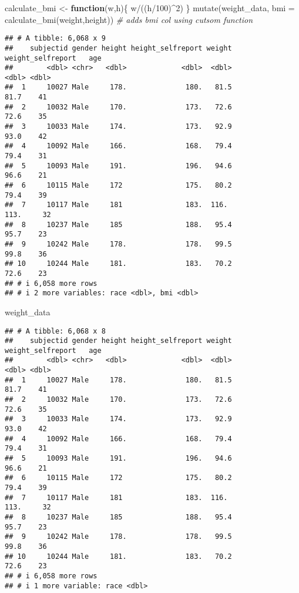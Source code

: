 \documentclass[
]{article}
\newenvironment{Shaded}{\begin{snugshade}}{\end{snugshade}}
\newcommand{\AttributeTok}[1]{\textcolor[rgb]{0.77,0.63,0.00}{#1}}
\newcommand{\CommentTok}[1]{\textcolor[rgb]{0.56,0.35,0.01}{\textit{#1}}}
\newcommand{\ControlFlowTok}[1]{\textcolor[rgb]{0.13,0.29,0.53}{\textbf{#1}}}
\newcommand{\DecValTok}[1]{\textcolor[rgb]{0.00,0.00,0.81}{#1}}
\newcommand{\FunctionTok}[1]{\textcolor[rgb]{0.00,0.00,0.00}{#1}}
\newcommand{\NormalTok}[1]{#1}
\newcommand{\OtherTok}[1]{\textcolor[rgb]{0.56,0.35,0.01}{#1}}
\newcommand{\SpecialCharTok}[1]{\textcolor[rgb]{0.00,0.00,0.00}{#1}}
\begin{document}
\begin{Shaded}
\begin{Highlighting}[]
\NormalTok{calculate\_bmi }\OtherTok{\textless{}{-}} \ControlFlowTok{function}\NormalTok{(w,h)\{ w}\SpecialCharTok{/}\NormalTok{((h}\SpecialCharTok{/}\DecValTok{100}\NormalTok{)}\SpecialCharTok{\^{}}\DecValTok{2}\NormalTok{) \}}
\FunctionTok{mutate}\NormalTok{(weight\_data, }\AttributeTok{bmi =} \FunctionTok{calculate\_bmi}\NormalTok{(weight,height)) }\CommentTok{\# adds bmi col using cutsom function}
\end{Highlighting}
\end{Shaded}

\begin{verbatim}
## # A tibble: 6,068 x 9
##    subjectid gender height height_selfreport weight weight_selfreport   age
##        <dbl> <chr>   <dbl>             <dbl>  <dbl>             <dbl> <dbl>
##  1     10027 Male     178.              180.   81.5              81.7    41
##  2     10032 Male     170.              173.   72.6              72.6    35
##  3     10033 Male     174.              173.   92.9              93.0    42
##  4     10092 Male     166.              168.   79.4              79.4    31
##  5     10093 Male     191.              196.   94.6              96.6    21
##  6     10115 Male     172               175.   80.2              79.4    39
##  7     10117 Male     181               183.  116.              113.     32
##  8     10237 Male     185               188.   95.4              95.7    23
##  9     10242 Male     178.              178.   99.5              99.8    36
## 10     10244 Male     181.              183.   70.2              72.6    23
## # i 6,058 more rows
## # i 2 more variables: race <dbl>, bmi <dbl>
\end{verbatim}

\begin{Shaded}
\begin{Highlighting}[]
\NormalTok{weight\_data}
\end{Highlighting}
\end{Shaded}

\begin{verbatim}
## # A tibble: 6,068 x 8
##    subjectid gender height height_selfreport weight weight_selfreport   age
##        <dbl> <chr>   <dbl>             <dbl>  <dbl>             <dbl> <dbl>
##  1     10027 Male     178.              180.   81.5              81.7    41
##  2     10032 Male     170.              173.   72.6              72.6    35
##  3     10033 Male     174.              173.   92.9              93.0    42
##  4     10092 Male     166.              168.   79.4              79.4    31
##  5     10093 Male     191.              196.   94.6              96.6    21
##  6     10115 Male     172               175.   80.2              79.4    39
##  7     10117 Male     181               183.  116.              113.     32
##  8     10237 Male     185               188.   95.4              95.7    23
##  9     10242 Male     178.              178.   99.5              99.8    36
## 10     10244 Male     181.              183.   70.2              72.6    23
## # i 6,058 more rows
## # i 1 more variable: race <dbl>
\end{verbatim}
\end{document}
